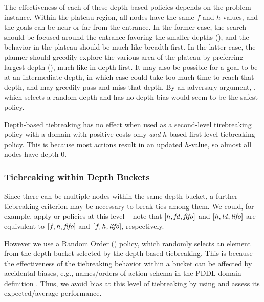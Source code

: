 The effectiveness of each of these depth-based policies depends on the
problem instance.  Within
the plateau region, all nodes have the same $f$ and $h$ values, 
and the goals can be near or far
from the entrance.  In the former case, the
search should be focused around the entrance favoring the smaller depths
(\fd), and the behavior in the plateau should be much like breadth-first. In the
latter case, the planner should greedily explore the various area of the
plateau by preferring largest depth (\ld), much like in
depth-first. 
It may also be possible for a goal to be at an intermediate depth, in which case
\fd could take too much time to reach that
depth, and \ld may greedily pass and miss that depth.
By an adversary argument, \rd, which selects a random depth and has no depth bias would seem to be the safest policy.

Depth-based tiebreaking has no effect when used as a second-level tirebreaking policy with a domain with positive costs only \emph{and} $h$-based first-level tiebreaking policy. This is because most actions result in an updated $h$-value, so almost all nodes have depth 0.

\subsubsection{Tiebreaking within Depth Buckets}
Since there can be multiple nodes within the same depth bucket,
a further tiebreaking criterion may be necessary to break ties among them.
We could, for example, apply \lifo or \fifo policies at this level -- 
note that $[h,{\mbox{\textit{fd}}},{\mbox{\textit{fifo}}}]$ and $[h,{\mbox{\textit{ld}}},{\mbox{\textit{lifo}}}]$ are equivalent to $[f,h,{\mbox{\textit{fifo}}}]$ and $[f,h,{\mbox{\textit{lifo}}}]$, respectively.

However we use a Random Order (\ro) policy, which 
randomly selects an element from the depth bucket selected by the depth-based tiebreaking.
This is because the effectiveness of the tiebreaking behavior within a bucket
can be affected by accidental biases, e.g., names/orders of action schema in the PDDL domain
definition \cite{vallati2015effective}.
Thus, we avoid bias at this level of tiebreaking by using \ro and assess its expected/average
performance.



